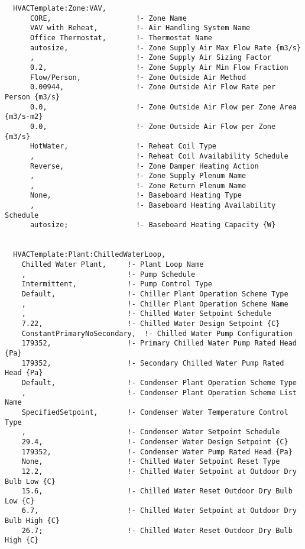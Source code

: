 \begin{lstlisting}
  HVACTemplate:Zone:VAV,
      CORE,                    !- Zone Name
      VAV with Reheat,         !- Air Handling System Name
      Office Thermostat,       !- Thermostat Name
      autosize,                !- Zone Supply Air Max Flow Rate {m3/s}
      ,                        !- Zone Supply Air Sizing Factor
      0.2,                     !- Zone Supply Air Min Flow Fraction
      Flow/Person,             !- Zone Outside Air Method
      0.00944,                 !- Zone Outside Air Flow Rate per Person {m3/s}
      0.0,                     !- Zone Outside Air Flow per Zone Area {m3/s-m2}
      0.0,                     !- Zone Outside Air Flow per Zone {m3/s}
      HotWater,                !- Reheat Coil Type
      ,                        !- Reheat Coil Availability Schedule
      Reverse,                 !- Zone Damper Heating Action
      ,                        !- Zone Supply Plenum Name
      ,                        !- Zone Return Plenum Name
      None,                    !- Baseboard Heating Type
      ,                        !- Baseboard Heating Availability Schedule
      autosize;                !- Baseboard Heating Capacity {W}


  HVACTemplate:Plant:ChilledWaterLoop,
    Chilled Water Plant,     !- Plant Loop Name
    ,                        !- Pump Schedule
    Intermittent,            !- Pump Control Type
    Default,                 !- Chiller Plant Operation Scheme Type
    ,                        !- Chiller Plant Operation Scheme Name
    ,                        !- Chilled Water Setpoint Schedule
    7.22,                    !- Chilled Water Design Setpoint {C}
    ConstantPrimaryNoSecondary,  !- Chilled Water Pump Configuration
    179352,                  !- Primary Chilled Water Pump Rated Head {Pa}
    179352,                  !- Secondary Chilled Water Pump Rated Head {Pa}
    Default,                 !- Condenser Plant Operation Scheme Type
    ,                        !- Condenser Plant Operation Scheme List Name
    SpecifiedSetpoint,       !- Condenser Water Temperature Control Type
    ,                        !- Condenser Water Setpoint Schedule
    29.4,                    !- Condenser Water Design Setpoint {C}
    179352,                  !- Condenser Water Pump Rated Head {Pa}
    None,                    !- Chilled Water Setpoint Reset Type
    12.2,                    !- Chilled Water Setpoint at Outdoor Dry Bulb Low {C}
    15.6,                    !- Chilled Water Reset Outdoor Dry Bulb Low {C}
    6.7,                     !- Chilled Water Setpoint at Outdoor Dry Bulb High {C}
    26.7;                    !- Chilled Water Reset Outdoor Dry Bulb High {C}



\end{lstlisting}
